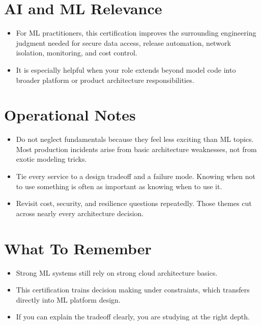 \documentclass[10pt,twocolumn]{article}
\begin{document}
\section*{AI and ML Relevance}
\begin{itemize}
\item For ML practitioners, this certification improves the surrounding engineering judgment needed for secure data access, release automation, network isolation, monitoring, and cost control.
\item It is especially helpful when your role extends beyond model code into broader platform or product architecture responsibilities.
\end{itemize}

\section*{Operational Notes}
\begin{itemize}
\item Do not neglect fundamentals because they feel less exciting than ML topics. Most production incidents arise from basic architecture weaknesses, not from exotic modeling tricks.
\item Tie every service to a design tradeoff and a failure mode. Knowing when not to use something is often as important as knowing when to use it.
\item Revisit cost, security, and resilience questions repeatedly. Those themes cut across nearly every architecture decision.
\end{itemize}

\section*{What To Remember}
\begin{itemize}
\item Strong ML systems still rely on strong cloud architecture basics.
\item This certification trains decision making under constraints, which transfers directly into ML platform design.
\item If you can explain the tradeoff clearly, you are studying at the right depth.
\end{itemize}
\end{document}
